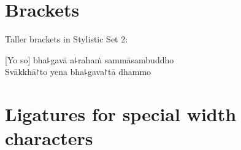 \documentclass[11pt,a4paper]{article}
\begin{document}
\thispagestyle{empty}\mbox{}

\section{Brackets}

Taller brackets in Stylistic Set 2:

[Yo so] bha꜕gavā a꜕rahaṁ sammāsambuddho\\
Svākkhā꜓to yena bha꜕gava꜓tā dhammo

\section{Ligatures for special width characters}

\end{document}
